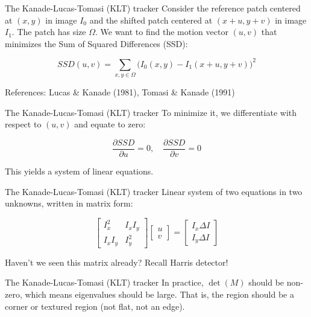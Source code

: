 \begin{frame}{The Kanade-Lucas-Tomasi (KLT) tracker}
  Consider the reference patch centered at $(x,y)$ in image $I_0$ and the shifted patch centered at $(x+u, y+v)$ in image $I_1$.  
  The patch has size $\Omega$. We want to find the motion vector $(u,v)$ that minimizes the Sum of Squared Differences (SSD):
  
  \[
  SSD(u,v) = \sum_{x,y \in \Omega} \big(I_0(x,y) - I_1(x+u, y+v)\big)^2
  \]
  
  References:  
  Lucas \& Kanade (1981), Tomasi \& Kanade (1991)
\end{frame}

\begin{frame}{The Kanade-Lucas-Tomasi (KLT) tracker}
  To minimize it, we differentiate with respect to $(u,v)$ and equate to zero:
  
  \[
  \frac{\partial SSD}{\partial u} = 0, \quad \frac{\partial SSD}{\partial v} = 0
  \]
  
  This yields a system of linear equations.
\end{frame}

\begin{frame}{The Kanade-Lucas-Tomasi (KLT) tracker}
  Linear system of two equations in two unknowns, written in matrix form:
  
  \[
  \begin{bmatrix}
    I_x^2 & I_x I_y \\
    I_x I_y & I_y^2
  \end{bmatrix}
  \begin{bmatrix}
    u \\ v
  \end{bmatrix}
  =
  \begin{bmatrix}
    I_x \Delta I \\ I_y \Delta I
  \end{bmatrix}
  \]
  
  Haven’t we seen this matrix already? Recall Harris detector!
\end{frame}

\begin{frame}{The Kanade-Lucas-Tomasi (KLT) tracker}
  In practice, $\det(M)$ should be non-zero, which means eigenvalues should be large.  
  That is, the region should be a corner or textured region (not flat, not an edge).
  
\end{frame}

